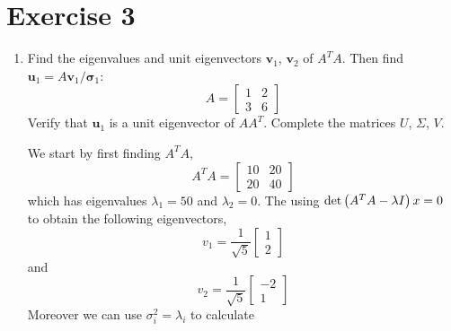 \section{Exercise 3}
\begin{enumerate}[label=\arabic*.]
    \item Find the eigenvalues and unit eigenvectors $\mathbf{v}_{1}$,
        $\mathbf{v}_{2}$ of $A^{T}A$. Then find $\mathbf{u}_{1} =
        A\mathbf{v}_{1}/\mathbf{\sigma}_{1}$:
        \begin{equation}
            A=
            \begin{bmatrix}
            1 & 2\\
            3 & 6
            \end{bmatrix}
        \end{equation}
        Verify that $\mathbf{u}_{1}$ is a unit eigenvector of $AA^{T}$.
        Complete the matrices $U$, $\Sigma$, $V$.
        \begin{mdframed}[style=MyFrame]
            We start by first finding $A^{T}A$,
            \begin{equation}
                A^{T}A  = 
                \begin{bmatrix}
                    10      &       20      \\
                    20      &       40 
                \end{bmatrix}
            \end{equation}
            which has eigenvalues $\lambda_{1} = 50$ and $\lambda_{2} = 0$.
            The using $\text{det}\left(A^{T}A-\lambda I\right)x=0$ to obtain
            the following eigenvectors,
            \begin{equation}
                v_{1} = 
                \frac{1}{\sqrt{5}}
                \begin{bmatrix}
                    1       \\
                    2
                \end{bmatrix}
            \end{equation}
            and
            \begin{equation}
                v_{2} = 
                \frac{1}{\sqrt{5}}
                \begin{bmatrix}
                    -2      \\
                    1
                \end{bmatrix}
            \end{equation}
            Moreover we can use $\sigma_{i}^{2}=\lambda_{i}$ to calculate

\end{mdframed}
\end{enumerate}
